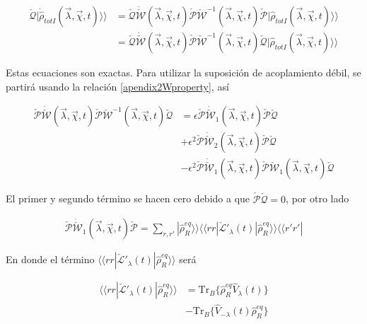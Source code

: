 \begin{appendixs}
\begin{align*}
    \check{\mathcal{Q}}|\dot{\hat{\rho}}_{totI}(\vec{\lambda},\vec{\chi},t) \rangle \rangle & = \check{\mathcal{Q}}\dot{\check{\mathcal{W}}}(\vec{\lambda},\vec{\chi},t)\check{\mathcal{P}}\check{\mathcal{W}}^{-1}(\vec{\lambda},\vec{\chi},t)\check{\mathcal{P}}|\hat{\rho}_{totI}(\vec{\lambda},\vec{\chi},t)\rangle \rangle \\
     & = \check{\mathcal{Q}}\dot{\check{\mathcal{W}}}(\vec{\lambda},\vec{\chi},t)\check{\mathcal{P}}\check{\mathcal{W}}^{-1}(\vec{\lambda},\vec{\chi},t)\check{\mathcal{Q}}|\hat{\rho}_{totI}(\vec{\lambda},\vec{\chi},t)\rangle \rangle 
\end{align*}

Estas ecuaciones son exactas. Para utilizar la suposición de acoplamiento débil, se partirá usando la relación \ref{apendix2Wproperty}, así

\begin{align*}
    \check{\mathcal{P}}\dot{\check{\mathcal{W}}}(\vec{\lambda},\vec{\chi},t)\check{\mathcal{P}}\check{\mathcal{W}}^{-1}(\vec{\lambda},\vec{\chi},t)\check{\mathcal{Q}} & = \epsilon \check{\mathcal{P}}\dot{\check{\mathcal{W}}}_{1}(\vec{\lambda},\vec{\chi},t) \check{\mathcal{P}}\check{\mathcal{Q}} \\
     & + \epsilon^{2} \check{\mathcal{P}}\dot{\check{\mathcal{W}}}_{2}(\vec{\lambda},\vec{\chi},t) \check{\mathcal{P}}\check{\mathcal{Q}} \\
     & - \epsilon^{2}\check{\mathcal{P}}\dot{\check{\mathcal{W}}}_{1}(\vec{\lambda},\vec{\chi},t)\check{\mathcal{P}} \check{\mathcal{W}}_{1}(\vec{\lambda},\vec{\chi},t)\check{\mathcal{Q}}
\end{align*}

El primer y segundo término se hacen cero debido a que $\check{\mathcal{P}}\check{\mathcal{Q}}=0$, por otro lado

\begin{align*}
    \check{\mathcal{P}}\dot{\check{\mathcal{W}}}_{1}(\vec{\lambda},\vec{\chi},t)\check{\mathcal{P}} = \sum_{r,r'}|\hat{\rho}^{eq}_{R} \rangle \rangle \langle \langle rr| \check{\mathcal{L}}'_{\lambda}(t)|\hat{\rho}_{R}^{eq}\rangle \rangle \langle \langle r'r'|
\end{align*}

En donde el término $\langle \langle rr|\check{\mathcal{L}}'_{\lambda}(t)|\hat{\rho}_{R}^{eq}\rangle \rangle$ será 

\begin{align*}
    \langle \langle rr|\check{\mathcal{L}}'_{\lambda}(t)|\hat{\rho}_{R}^{eq}\rangle \rangle & = \text{Tr}_{B}\{\hat{\rho}^{eq}_{R}\hat{V}_{\lambda}(t)\} \\
                    & - \text{Tr}_{B}\{\hat{V}_{-\lambda}(t)\hat{\rho}^{eq}_{R}\}
\end{align*}


\end{appendixs}
